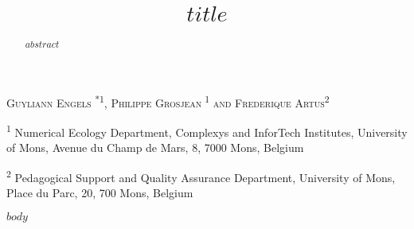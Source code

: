 \documentclass{aims} %
\title[$runtitle$]
{$title$} %
\author[Guyliann Engels, Philippe Grosjean and Frédérique Artus]{}
\theoremstyle{definition}
\begin{document}
\maketitle

\centerline{\scshape
Guyliann Engels \textsuperscript{{{\href{mailto:Guyliann.Engels@umons.ac.be}{\textrm{\Letter}}} *1}}, Philippe Grosjean\textsuperscript{{\href{mailto:Philippe.Grosjean@umons.ac.be}{\textrm{\Letter}}} 1} and Frederique Artus\textsuperscript{{\href{mailto:Frederique.Artus@umons.ac.be}{\textrm{\Letter}}}2}}

\medskip

{\footnotesize
 \centerline{\textsuperscript{1} Numerical Ecology Department, Complexys and InforTech Institutes, University of Mons, Avenue du Champ de Mars, 8, 7000 Mons, Belgium}
} %

\medskip

{\footnotesize
 \centerline{\textsuperscript{2} Pedagogical Support and Quality Assurance Department, University of Mons, Place du Parc, 20, 700 Mons, Belgium}
}

\bigskip



\begin{abstract}
  $abstract$
\end{abstract}


$body$

\end{document}
